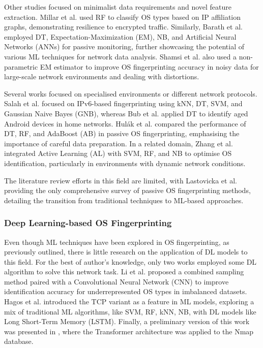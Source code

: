 Other studies focused on minimalist data requirements and novel feature extraction. Millar et al. \cite{millar_operating_2020} used RF to classify OS types based on IP affiliation graphs, demonstrating resilience to encrypted traffic. Similarly, Barath et al. \cite{barath_use_2021} employed DT, Expectation-Maximization (EM), NB, and Artificial Neural Networks (ANNs) for passive monitoring, further showcasing the potential of various ML techniques for network data analysis. Shamsi et al. \cite{shamsi_faulds_2021} also used a non-parametric EM estimator to improve OS fingerprinting accuracy in noisy data for large-scale network environments and dealing with distortions.

Several works focused on specialised environments or different network protocols. Salah et al. \cite{salah_desktop_2022} focused on IPv6-based fingerprinting using kNN, DT, SVM, and Gaussian Naive Bayes (GNB), whereas Bub et al. \cite{bub_towards_2022} applied DT to identify aged Android devices in home networks. Hulák et al. \cite{hulak_evaluation_2023} compared the performance of DT, RF, and AdaBoost (AB) in passive OS fingerprinting, emphasising the importance of careful data preparation. In a related domain, Zhang et al. \cite{zhang_operating_2022} integrated Active Learning (AL) with SVM, RF, and NB to optimise OS identification, particularly in environments with dynamic network conditions.

The literature review efforts in this field are limited, with Lastovicka et al. \cite{lastovicka_passive_2023} providing the only comprehensive survey of passive OS fingerprinting methods, detailing the transition from traditional techniques to ML-based approaches. 

\subsubsection{Deep Learning-based OS Fingerprinting}
\label{subsubsec:dl-based-os-fingerprinting}

Even though ML techniques have been explored in OS fingerprinting, as previously outlined, there is little research on the application of DL models to this field. For the best of author's knowledge, only two works employed some DL algorithm to solve this network task. Li et al. \cite{li_passive_2023} proposed a combined sampling method paired with a Convolutional Neural Network (CNN) to improve identification accuracy for underrepresented OS types in imbalanced datasets. Hagos et al. \cite{hagos_machine-advanced_2020, hagos_TCPvariant_2021} introduced the TCP variant as a feature in ML models, exploring a mix of traditional ML algorithms, like SVM, RF, kNN, NB, with DL models like Long Short-Term Memory (LSTM). Finally, a preliminary version of this work was presented in \cite{perez_jove_towards_2024}, where the Transformer architecture was applied to the Nmap database.

